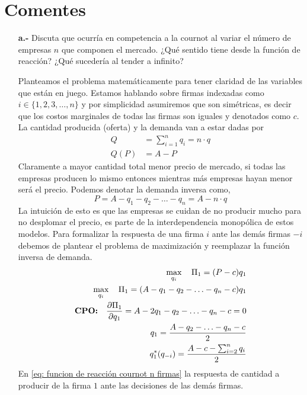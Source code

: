 \section{Comentes}

\begin{itemize}
    \item [\textbf{a.-}] Discuta que ocurría en competencia a la cournot al variar el número de empresas $n$ que componen el mercado. ¿Qué sentido tiene desde la función de reacción? ¿Qué sucedería al tender a infinito? 
    \begin{solution}
        Planteamos el problema matemáticamente para tener claridad de las variables que están en juego. Estamos hablando sobre firmas indexadas como $i \in \{1,2,3,\ldots, n \}$ y por simplicidad asumiremos que son simétricas, es decir que los costos marginales de todas las firmas son iguales y denotados como $c$. La cantidad producida (oferta) y la demanda van a estar dadas por
        \begin{align}
            Q &= \sum^n_{i = 1}q_i = n\cdot q \\
            Q(P) &= A-P
        \end{align}
        Claramente a mayor cantidad total menor precio de mercado, si todas las empresas producen lo mismo entonces mientras más empresas hayan menor será el precio. Podemos denotar la demanda inversa como, 
        \begin{equation}
            P = A - q_1 - q_2 -\ldots -q_n = A-n\cdot q
        \end{equation}
        La intuición de esto es que las empresas se cuidan de no producir mucho para no desplomar el precio, es parte de la interdependencia monopólica de estos modelos. Para formalizar la respuesta de una firma $i$ ante las demás firmas $-i$ debemos de plantear el problema de maximización y reemplazar la función inversa de demanda. 
        \begin{align}
            \max_{q_i} \quad \Pi_1 = (P-c)q_1 \notag \\
            \max_{q_i} \quad \Pi_1 = (A - q_1 - q_2 -\ldots -q_n - c)q_1 \notag \\
            \textbf{CPO:}\quad \frac{\partial \Pi_1}{\partial q_1} = A - 2q_1 - q_2 - \ldots -q_n -c = 0 \notag \\
            q_1 = \frac{A - q_2 - \ldots - q_n - c}{2} \notag \\
            q_1^*(q_{-i}) = \frac{A-c - \sum^{n}_{i = 2}q_i}{2} \label{eq: funcion de reacción cournot n firmas}
        \end{align}
        En \ref{eq: funcion de reacción cournot n firmas} la respuesta de cantidad a producir de la firma $1$ ante las decisiones de las demás firmas. 


\end{solution}
\end{itemize}
